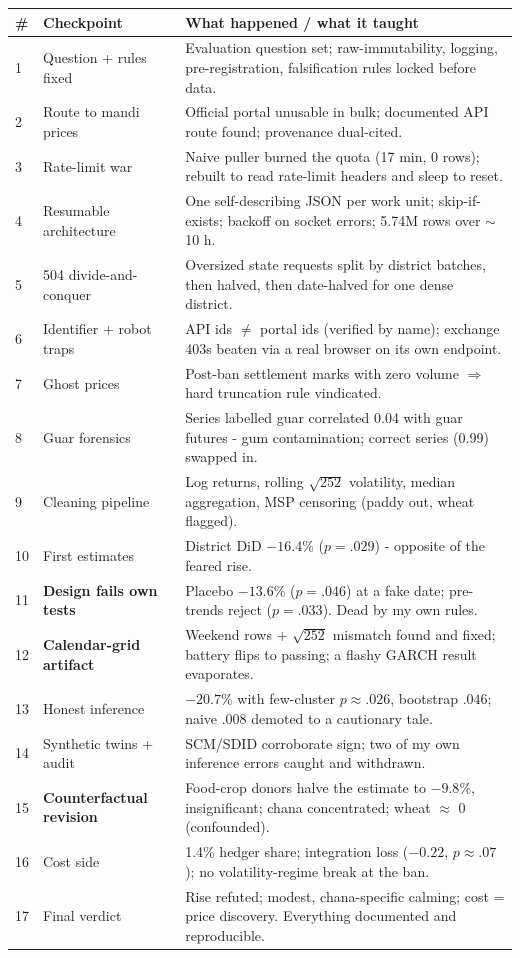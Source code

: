 \documentclass[11pt]{article}
\begin{document}
\begin{center}\small
\begin{tabular}{p{0.5cm} p{4.6cm} p{9.2cm}}
\toprule
\# & Checkpoint & What happened / what it taught \\
\midrule
1 & Question + rules fixed & Evaluation question set; raw-immutability, logging, pre-registration, falsification rules locked before data. \\
2 & Route to mandi prices & Official portal unusable in bulk; documented API route found; provenance dual-cited. \\
3 & Rate-limit war & Naive puller burned the quota (17 min, 0 rows); rebuilt to read rate-limit headers and sleep to reset. \\
4 & Resumable architecture & One self-describing JSON per work unit; skip-if-exists; backoff on socket errors; 5.74M rows over $\sim$10 h. \\
5 & 504 divide-and-conquer & Oversized state requests split by district batches, then halved, then date-halved for one dense district. \\
6 & Identifier + robot traps & API ids $\ne$ portal ids (verified by name); exchange 403s beaten via a real browser on its own endpoint. \\
7 & Ghost prices & Post-ban settlement marks with zero volume $\Rightarrow$ hard truncation rule vindicated. \\
8 & Guar forensics & Series labelled guar correlated 0.04 with guar futures - gum contamination; correct series (0.99) swapped in. \\
9 & Cleaning pipeline & Log returns, rolling $\sqrt{252}$ volatility, median aggregation, MSP censoring (paddy out, wheat flagged). \\
10 & First estimates & District DiD $-16.4\%$ ($p=.029$) - opposite of the feared rise. \\
11 & \textbf{Design fails own tests} & Placebo $-13.6\%$ ($p=.046$) at a fake date; pre-trends reject ($p=.033$). Dead by my own rules. \\
12 & \textbf{Calendar-grid artifact} & Weekend rows + $\sqrt{252}$ mismatch found and fixed; battery flips to passing; a flashy GARCH result evaporates. \\
13 & Honest inference & $-20.7\%$ with few-cluster $p\approx.026$, bootstrap $.046$; naive $.008$ demoted to a cautionary tale. \\
14 & Synthetic twins + audit & SCM/SDID corroborate sign; two of my own inference errors caught and withdrawn. \\
15 & \textbf{Counterfactual revision} & Food-crop donors halve the estimate to $-9.8\%$, insignificant; chana concentrated; wheat $\approx$ 0 (confounded). \\
16 & Cost side & 1.4\% hedger share; integration loss ($-0.22$, $p\approx.07$); no volatility-regime break at the ban. \\
17 & Final verdict & Rise refuted; modest, chana-specific calming; cost = price discovery. Everything documented and reproducible. \\
\bottomrule
\end{tabular}
\end{center}
\end{document}
